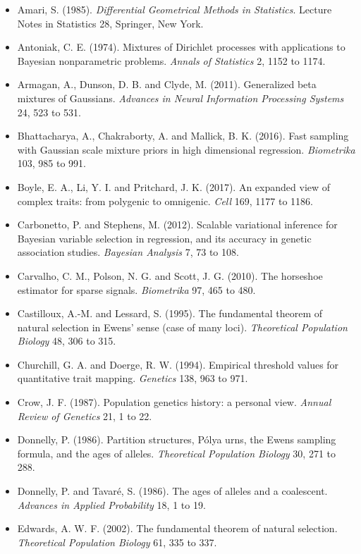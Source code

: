 \begin{itemize}\itemsep2pt \small
\item Amari, S. (1985). \emph{Differential Geometrical Methods in Statistics}. Lecture Notes in
Statistics 28, Springer, New York.
\item Antoniak, C. E. (1974). Mixtures of Dirichlet processes with applications to Bayesian
nonparametric problems. \emph{Annals of Statistics} 2, 1152 to 1174.
\item Armagan, A., Dunson, D. B. and Clyde, M. (2011). Generalized beta mixtures of Gaussians.
\emph{Advances in Neural Information Processing Systems} 24, 523 to 531.
\item Bhattacharya, A., Chakraborty, A. and Mallick, B. K. (2016). Fast sampling with Gaussian
scale mixture priors in high dimensional regression. \emph{Biometrika} 103, 985 to 991.
\item Boyle, E. A., Li, Y. I. and Pritchard, J. K. (2017). An expanded view of complex traits: from
polygenic to omnigenic. \emph{Cell} 169, 1177 to 1186.
\item Carbonetto, P. and Stephens, M. (2012). Scalable variational inference for Bayesian variable
selection in regression, and its accuracy in genetic association studies.
\emph{Bayesian Analysis} 7, 73 to 108.
\item Carvalho, C. M., Polson, N. G. and Scott, J. G. (2010). The horseshoe estimator for sparse
signals. \emph{Biometrika} 97, 465 to 480.
\item Castilloux, A.-M. and Lessard, S. (1995). The fundamental theorem of natural selection in
Ewens' sense (case of many loci). \emph{Theoretical Population Biology} 48, 306 to 315.
\item Churchill, G. A. and Doerge, R. W. (1994). Empirical threshold values for quantitative trait
mapping. \emph{Genetics} 138, 963 to 971.
\item Crow, J. F. (1987). Population genetics history: a personal view. \emph{Annual Review of
Genetics} 21, 1 to 22.
\item Donnelly, P. (1986). Partition structures, P\'olya urns, the Ewens sampling formula, and the
ages of alleles. \emph{Theoretical Population Biology} 30, 271 to 288.
\item Donnelly, P. and Tavar\'e, S. (1986). The ages of alleles and a coalescent.
\emph{Advances in Applied Probability} 18, 1 to 19.
\item Edwards, A. W. F. (2002). The fundamental theorem of natural selection.
\emph{Theoretical Population Biology} 61, 335 to 337.

\end{itemize}
